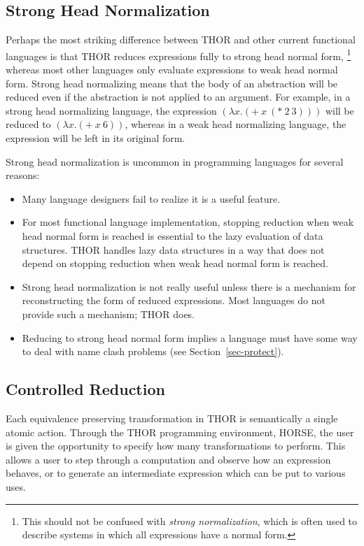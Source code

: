 \subsection{Strong Head Normalization}

	Perhaps the most striking difference between THOR and other
current functional languages is that THOR reduces expressions fully to
strong head normal form,
	 \footnote{This should not be confused with {\em strong normalization},
	  which is often used to describe systems in which all expressions have
 	  a normal form.}
whereas most other languages only evaluate
expressions to weak head normal form.  Strong head normalizing 
means that the body of an abstraction will be
reduced even if the abstraction is not applied to an argument.
For example, in a strong head normalizing language, the expression
\( (\lambda x . (+ \ x \  (* \ 2 \  3))) \) will be reduced to 
\( (\lambda x . (+ \ x \ 6)) \), whereas in a weak head normalizing
language, the expression will be left in its original
form.

	Strong head normalization is uncommon in programming languages for several
reasons:
\begin{itemize}
	\item Many language designers fail to realize it is a useful feature.
	\item For most functional language implementation, stopping reduction
			when weak head	normal form is reached is essential to the lazy 
			evaluation of data structures. 
			THOR handles lazy data structures in a way that does not
			depend on stopping reduction when weak head normal form is reached.
	\item Strong head normalization is not really useful unless there is a
			mechanism for reconstructing the form of reduced expressions.  
			Most languages do not provide such a mechanism; THOR does.  
	\item Reducing to strong head normal form implies a language must
			have some way to deal with name clash problems (see
			Section~\ref{sec-protect}).  
\end{itemize}


\subsection{Controlled Reduction}

	Each equivalence preserving transformation in THOR is
semantically a single atomic action.  Through the THOR
programming environment, HORSE, the user is given the opportunity
to specify how many transformations to perform.  This allows a
user to step through a computation and observe how an expression
behaves, or to generate an intermediate expression which can be
put to various uses.


